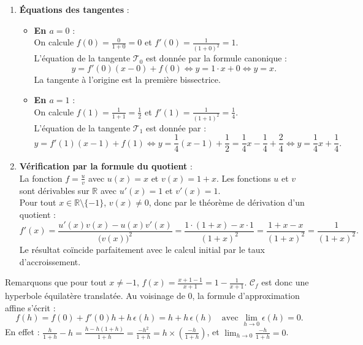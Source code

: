 \documentclass[11pt,a4paper]{article}
\newcommand{\R}{\mathbb{R}}
\begin{document}
\begin{correctionbox}
\begin{enumerate}[label=\textbf{\arabic*.}]
    \item \textbf{Équations des tangentes} :
    \begin{itemize}
        \item \textbf{En $a = 0$} :\\
        On calcule $f(0) = \frac{0}{1+0} = 0$ et $f'(0) = \frac{1}{(1+0)^2} = 1$.\\
        L'équation de la tangente $\mathcal{T}_0$ est donnée par la formule canonique :
        \[
        y = f'(0)(x - 0) + f(0) \iff y = 1 \cdot x + 0 \iff y = x.
        \]
        La tangente à l'origine est la première bissectrice.
        \item \textbf{En $a = 1$} :\\
        On calcule $f(1) = \frac{1}{1+1} = \frac{1}{2}$ et $f'(1) = \frac{1}{(1+1)^2} = \frac{1}{4}$.\\
        L'équation de la tangente $\mathcal{T}_1$ est donnée par :
        \[
        y = f'(1)(x - 1) + f(1) \iff y = \frac{1}{4}(x - 1) + \frac{1}{2} = \frac{1}{4}x - \frac{1}{4} + \frac{2}{4} \iff y = \frac{1}{4}x + \frac{1}{4}.
        \]
    \end{itemize}

    \item \textbf{Vérification par la formule du quotient} :\\
    La fonction $f = \frac{u}{v}$ avec $u(x) = x$ et $v(x) = 1+x$. Les fonctions $u$ et $v$ sont dérivables sur $\R$ avec $u'(x) = 1$ et $v'(x) = 1$.\\
    Pour tout $x \in \R \setminus \{-1\}$, $v(x) \neq 0$, donc par le théorème de dérivation d'un quotient :
    \[
    f'(x) = \frac{u'(x)v(x) - u(x)v'(x)}{\big(v(x)\big)^2} = \frac{1 \cdot (1+x) - x \cdot 1}{(1+x)^2} = \frac{1+x-x}{(1+x)^2} = \frac{1}{(1+x)^2}.
    \]
    Le résultat coïncide parfaitement avec le calcul initial par le taux d'accroissement.
\end{enumerate}
\end{correctionbox}

\begin{remarquabox}
Remarquons que pour tout $x \neq -1$, $f(x) = \frac{x+1-1}{x+1} = 1 - \frac{1}{x+1}$. $\mathcal{C}_f$ est donc une hyperbole équilatère translatée.
Au voisinage de $0$, la formule d'approximation affine s'écrit :
\[
f(h) = f(0) + f'(0)h + h\,\epsilon(h) = h + h\,\epsilon(h) \quad \text{avec } \lim_{h \to 0} \epsilon(h) = 0.
\]
En effet : $\frac{h}{1+h} - h = \frac{h - h(1+h)}{1+h} = \frac{-h^2}{1+h} = h \times \left(\frac{-h}{1+h}\right)$, et $\lim_{h \to 0} \frac{-h}{1+h} = 0$.
\end{remarquabox}
\end{document}
